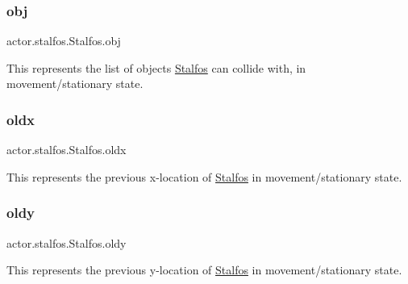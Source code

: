 \subsubsection{\texorpdfstring{obj}{obj}}
{\footnotesize\ttfamily actor.\+stalfos.\+Stalfos.\+obj}



This represents the list of objects \hyperlink{classactor_1_1stalfos_1_1_stalfos}{Stalfos} can collide with, in movement/stationary state. 

\mbox{\label{classactor_1_1stalfos_1_1_stalfos_ae5e4aa1e1b15ec9e23b59e73584bd474}} 
\subsubsection{\texorpdfstring{oldx}{oldx}}
{\footnotesize\ttfamily actor.\+stalfos.\+Stalfos.\+oldx}



This represents the previous x-\/location of \hyperlink{classactor_1_1stalfos_1_1_stalfos}{Stalfos} in movement/stationary state. 

\mbox{\label{classactor_1_1stalfos_1_1_stalfos_a591766705ab3a05f6c09f71172c1a8c4}} 
\subsubsection{\texorpdfstring{oldy}{oldy}}
{\footnotesize\ttfamily actor.\+stalfos.\+Stalfos.\+oldy}



This represents the previous y-\/location of \hyperlink{classactor_1_1stalfos_1_1_stalfos}{Stalfos} in movement/stationary state. 

\mbox{\label{classactor_1_1stalfos_1_1_stalfos_a7e91c289f586728284c20c3963b86b06}} 
